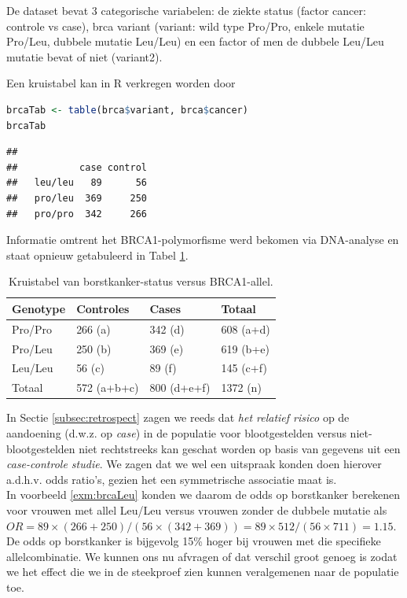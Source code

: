 \documentclass[
  12pt,dutch,coursenotes]{book}
\theoremstyle{definition}
\theoremstyle{definition}
\theoremstyle{definition}
\theoremstyle{definition}
\theoremstyle{remark}
\begin{document}
De dataset bevat 3 categorische variabelen: de ziekte status (factor cancer: controle vs case), brca variant (variant: wild type Pro/Pro, enkele mutatie Pro/Leu, dubbele mutatie Leu/Leu) en een factor of men de dubbele Leu/Leu mutatie bevat of niet (variant2).

Een kruistabel kan in R verkregen worden door

\begin{lstlisting}[language=R]
brcaTab <- table(brca$variant, brca$cancer)
brcaTab
\end{lstlisting}

\begin{lstlisting}
##          
##           case control
##   leu/leu   89      56
##   pro/leu  369     250
##   pro/pro  342     266
\end{lstlisting}

Informatie omtrent het BRCA1-polymorfisme werd bekomen via DNA-analyse en staat opnieuw getabuleerd in Tabel \ref{tab:leu3}.

\begin{table}

\caption{\label{tab:leu3}Kruistabel van borstkanker-status versus BRCA1-allel.}
\centering
\begin{tabular}[t]{llll}
\toprule
Genotype & Controles & Cases & Totaal\\
\midrule
Pro/Pro & 266 (a) & 342 (d) & 608 (a+d)\\
Pro/Leu & 250 (b) & 369 (e) & 619 (b+e)\\
Leu/Leu & 56 (c) & 89 (f) & 145 (c+f)\\
Totaal & 572 (a+b+c) & 800 (d+e+f) & 1372 (n)\\
\bottomrule
\end{tabular}
\end{table}

In Sectie \ref{subsec:retrospect} zagen we reeds dat \emph{het relatief risico} op de aandoening (d.w.z. op \emph{case})
in de populatie voor blootgestelden versus niet-blootgestelden niet rechtstreeks kan geschat worden op basis van gegevens uit een \emph{case-controle studie}.
We zagen dat we wel een uitspraak konden doen hierover a.d.h.v. odds ratio's, gezien het een symmetrische associatie maat is.\\
In voorbeeld \ref{exm:brcaLeu} konden we daarom de odds op borstkanker berekenen voor vrouwen met allel Leu/Leu
versus vrouwen zonder de dubbele mutatie als \(OR=89\times (266+250)/(56\times (342+369))=89\times 512/(56 \times 711)=1.15\).
De odds op borstkanker is bijgevolg 15\% hoger bij vrouwen met die specifieke allelcombinatie.
We kunnen ons nu afvragen of dat verschil groot genoeg is zodat we het effect die we in de steekproef zien kunnen veralgemenen naar de populatie toe.
\end{document}
